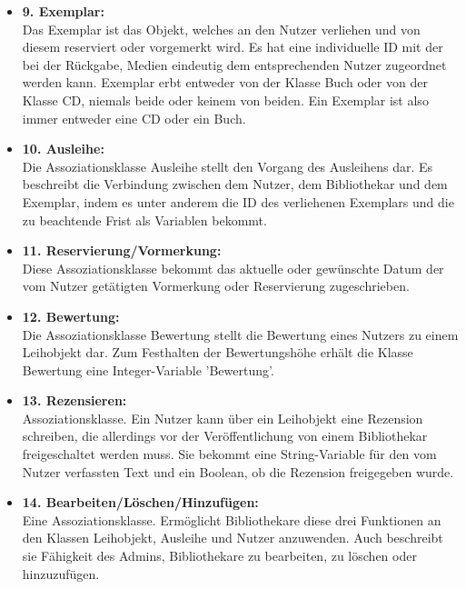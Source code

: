 \documentclass[fontsize=12pt,paper=a4,twoside]{scrartcl}
\begin{document}
\begin{itemize}
\item \textbf{9. Exemplar:}\\
Das Exemplar ist das Objekt, welches an den Nutzer verliehen und von diesem reserviert oder vorgemerkt wird. Es hat eine individuelle ID mit der bei der Rückgabe, Medien
eindeutig dem entsprechenden Nutzer zugeordnet werden kann. Exemplar erbt entweder von
der Klasse Buch oder von der Klasse CD, niemals beide oder keinem von beiden. Ein Exemplar ist also immer entweder eine CD oder ein Buch.

\item \textbf{10. Ausleihe:}\\
Die Assoziationsklasse Ausleihe stellt den Vorgang des Ausleihens dar.
Es beschreibt die Verbindung zwischen dem Nutzer, dem Bibliothekar und dem Exemplar, indem es unter anderem die ID des verliehenen Exemplars und die zu beachtende Frist 
als Variablen bekommt. 


\item \textbf{11. Reservierung/Vormerkung:}\\
Diese Assoziationsklasse bekommt das aktuelle oder gewünschte Datum der vom Nutzer getätigten Vormerkung oder Reservierung zugeschrieben.

\item \textbf{12. Bewertung:}\\
Die Assoziationsklasse Bewertung stellt die Bewertung eines Nutzers zu einem Leihobjekt dar. Zum Festhalten der Bewertungshöhe erhält die Klasse Bewertung
eine Integer-Variable 'Bewertung'.

\item \textbf{13. Rezensieren:}\\
Assoziationsklasse. Ein Nutzer kann über ein Leihobjekt eine Rezension schreiben, die allerdings vor der Veröffentlichung von einem Bibliothekar freigeschaltet werden muss. Sie bekommt eine String-Variable für den vom Nutzer verfassten Text und ein Boolean, ob die Rezension freigegeben wurde.

\item \textbf{14. Bearbeiten/Löschen/Hinzufügen:}\\
Eine Assoziationsklasse. Ermöglicht Bibliothekare diese drei Funktionen an den Klassen 
Leihobjekt, Ausleihe und Nutzer anzuwenden. Auch beschreibt sie Fähigkeit des Admins,
Bibliothekare zu bearbeiten, zu löschen oder hinzuzufügen.
\end{itemize}
\end{document}
